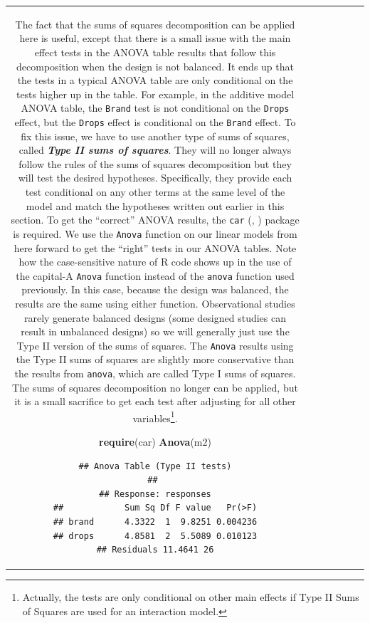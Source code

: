 \documentclass[]{book}
\newenvironment{Shaded}{\begin{snugshade}}{\end{snugshade}}
\newcommand{\KeywordTok}[1]{\textcolor[rgb]{0.13,0.29,0.53}{\textbf{#1}}}
\newcommand{\NormalTok}[1]{#1}
\let\rmarkdownfootnote\footnote%
\def\footnote{\protect\rmarkdownfootnote}
\theoremstyle{definition}
\theoremstyle{definition}
\theoremstyle{remark}
\begin{document}
\begin{longtable}[]{@{}ccccccc@{}}
\begin{minipage}[b]{0.10\columnwidth}
\begin{Shaded}
\begin{Highlighting}[]
\begin{Shaded}
\begin{Highlighting}[]
The fact that the sums of squares decomposition can be applied here is
useful, except that there is a small issue with the main effect tests in
the ANOVA table results that follow this decomposition when the design
is not balanced. It ends up that the tests in a typical ANOVA table are
only conditional on the tests higher up in the table. For example, in
the additive model ANOVA table, the \texttt{Brand} test is not
conditional on the \texttt{Drops} effect, but the \texttt{Drops} effect
is conditional on the \texttt{Brand} effect. To fix this issue, we have
to use another type of sums of squares, called \textbf{\emph{Type II
sums of squares}}. They will no longer always follow the rules of the
sums of squares decomposition but they will test the desired hypotheses.
Specifically, they provide each test conditional on any other terms at
the same level of the model and match the hypotheses written out earlier
in this section. To get the ``correct'' ANOVA results, the \texttt{car}
(\citet{R-car}, \citet{Fox2011}) package is required. We use the
\texttt{Anova} function on our linear models from here forward to get
the ``right'' tests in our ANOVA tables. Note how the case-sensitive
nature of R code shows up in the use of the capital-A \texttt{Anova}
function instead of the \texttt{anova} function used previously. In this
case, because the design was balanced, the results are the same using
either function. Observational studies rarely generate balanced designs
(some designed studies can result in unbalanced designs) so we will
generally just use the Type II version of the sums of squares. The
\texttt{Anova} results using the Type II sums of squares are slightly
more conservative than the results from \texttt{anova}, which are called
Type I sums of squares. The sums of squares decomposition no longer can
be applied, but it is a small sacrifice to get each test after adjusting
for all other variables\footnote{Actually, the tests are only
  conditional on other main effects if Type II Sums of Squares are used
  for an interaction model.}.

\begin{Shaded}
\begin{Highlighting}[]
\KeywordTok{require}\NormalTok{(car)}
\KeywordTok{Anova}\NormalTok{(m2)}
\end{Highlighting}
\end{Shaded}

\begin{verbatim}
## Anova Table (Type II tests)
## 
## Response: responses
##            Sum Sq Df F value   Pr(>F)
## brand      4.3322  1  9.8251 0.004236
## drops      4.8581  2  5.5089 0.010123
## Residuals 11.4641 26
\end{verbatim}


\end{Highlighting}
\end{Shaded}
\end{Highlighting}
\end{Shaded}
\end{minipage}
\end{longtable}
\end{document}
